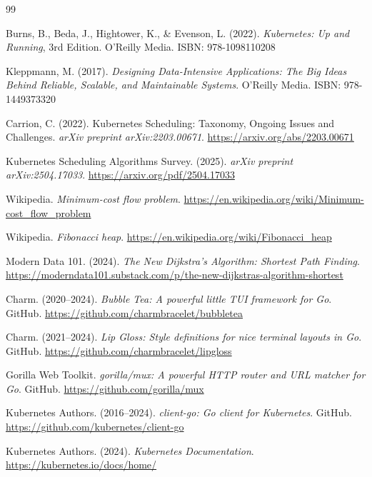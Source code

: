 \documentclass[11pt]{article}
\begin{document}
\begin{thebibliography}{99}




Burns, B., Beda, J., Hightower, K., \& Evenson, L. (2022). \textit{Kubernetes: Up and Running}, 3rd Edition.
O'Reilly Media. ISBN: 978-1098110208

Kleppmann, M. (2017). \textit{Designing Data-Intensive Applications: The Big Ideas Behind Reliable, Scalable, and Maintainable Systems}.
O'Reilly Media. ISBN: 978-1449373320




Carrion, C. (2022). Kubernetes Scheduling: Taxonomy, Ongoing Issues and Challenges.
\textit{arXiv preprint arXiv:2203.00671}. \url{https://arxiv.org/abs/2203.00671}

Kubernetes Scheduling Algorithms Survey. (2025).
\textit{arXiv preprint arXiv:2504.17033}. \url{https://arxiv.org/pdf/2504.17033}

Wikipedia. \textit{Minimum-cost flow problem}.
\url{https://en.wikipedia.org/wiki/Minimum-cost_flow_problem}

Wikipedia. \textit{Fibonacci heap}.
\url{https://en.wikipedia.org/wiki/Fibonacci_heap}

Modern Data 101. (2024). \textit{The New Dijkstra's Algorithm: Shortest Path Finding}.
\url{https://moderndata101.substack.com/p/the-new-dijkstras-algorithm-shortest}




Charm. (2020--2024). \textit{Bubble Tea: A powerful little TUI framework for Go}.
GitHub. \url{https://github.com/charmbracelet/bubbletea}

Charm. (2021--2024). \textit{Lip Gloss: Style definitions for nice terminal layouts in Go}.
GitHub. \url{https://github.com/charmbracelet/lipgloss}

Gorilla Web Toolkit. \textit{gorilla/mux: A powerful HTTP router and URL matcher for Go}.
GitHub. \url{https://github.com/gorilla/mux}

Kubernetes Authors. (2016--2024). \textit{client-go: Go client for Kubernetes}.
GitHub. \url{https://github.com/kubernetes/client-go}




Kubernetes Authors. (2024). \textit{Kubernetes Documentation}.
\url{https://kubernetes.io/docs/home/}


\end{thebibliography}
\end{document}
